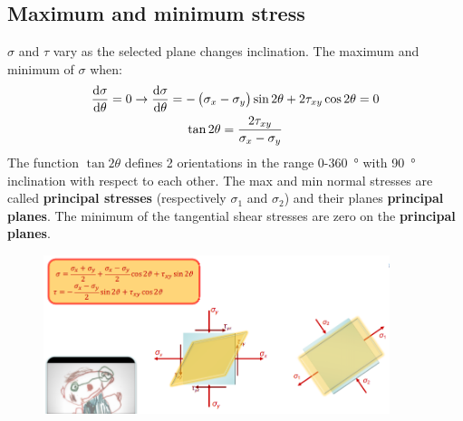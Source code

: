 \documentclass[class=report, crop=false, 12pt,a4paper]{standalone}
\begin{document}
\subsection{Maximum and minimum stress}
$\sigma$ and $\tau$ vary as the selected plane changes inclination. The maximum and minimum of $\sigma$ when: 
\begin{gather}
    \frac{\dif \sigma}{\dif \theta} = 0 \rightarrow \frac{\dif \sigma}{\dif \theta} = - \left(\sigma_x - \sigma_y\right)\sin 2\theta + 2\tau_{xy}\cos 2\theta = 0\\
    \tan 2\theta = \frac{2\tau_{xy}}{\sigma_x - \sigma_y}
\end{gather}
The function $\tan 2\theta$ defines 2 orientations in the range 0-\SI{360}{\degree} with \SI{90}{\degree} inclination with respect to each other. The max and min normal stresses are called \textbf{principal stresses} (respectively $\sigma_1$ and $\sigma_2$) and their planes \textbf{principal planes}. The minimum of the tangential shear stresses are zero on the \textbf{principal planes}.
\begin{figure}[H]
    \centering
    \includegraphics[width = 0.9\textwidth]{../img/diagram45.png}
    \caption{}
\end{figure}
\end{document}
